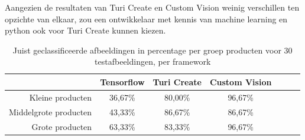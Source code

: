Aangezien de resultaten van Turi Create en Custom Vision weinig verschillen ten opzichte van elkaar, zou een ontwikkelaar met kennis van machine learning en python ook voor Turi Create kunnen kiezen. 
\begin{table}[htbp]
    \centering
      \begin{tabular}{rcccccc}
      \toprule
      \textbf{} & \textbf{Tensorflow} & \textbf{Turi Create} & \textbf{Custom Vision} \\
      \midrule
      Kleine producten & 36,67\% & 80,00\% & 96,67\% \\
      Middelgrote producten & 43,33\% & 86,67\% & 86,67\% \\
      Grote producten & 63,33\% & 83,33\% & 96,67\% \\
      \bottomrule
      \end{tabular}%
      \caption{Juist geclassificeerde afbeeldingen in percentage per groep producten voor 30 testafbeeldingen, per framework}
    \label{tab:samenvattendetabel}%
  \end{table}%
  